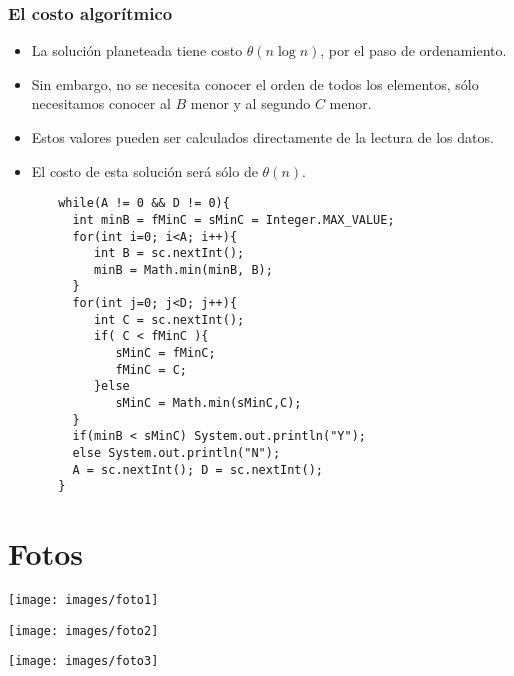 \documentclass{beamer}
\begin{document}
\begin{frame}
 \frametitle{El costo algorítmico}
 \begin{itemize}
   \item La solución planeteada tiene costo $\theta(n \log n)$, por el paso de ordenamiento.
   \item Sin embargo, no se necesita conocer el orden de todos los elementos, sólo necesitamos conocer al $B$ menor y al segundo $C$ menor.
   \item Estos valores pueden ser calculados directamente de la lectura de los datos.
   \item El costo de esta solución será sólo de $\theta(n)$.
 \end{itemize}
\end{frame}

\begin{frame}[fragile]
 \begin{lstlisting}
       while(A != 0 && D != 0){
         int minB = fMinC = sMinC = Integer.MAX_VALUE; 
         for(int i=0; i<A; i++){
            int B = sc.nextInt();
            minB = Math.min(minB, B);
         }
         for(int j=0; j<D; j++){
            int C = sc.nextInt();
            if( C < fMinC ){
               sMinC = fMinC;
               fMinC = C;
            }else 
               sMinC = Math.min(sMinC,C);
         }
         if(minB < sMinC) System.out.println("Y");
         else System.out.println("N");
         A = sc.nextInt(); D = sc.nextInt();
       }
 \end{lstlisting}
\end{frame}

\section{Fotos}
\begin{frame}
 \begin{center}
 \texttt{[image: images/foto1]}
 \end{center}
\end{frame}

\begin{frame}
 \begin{center}
 \texttt{[image: images/foto2]}
 \end{center}
\end{frame}

\begin{frame}
 \begin{center}
 \texttt{[image: images/foto3]}
 \end{center}
\end{frame}
\end{document}

